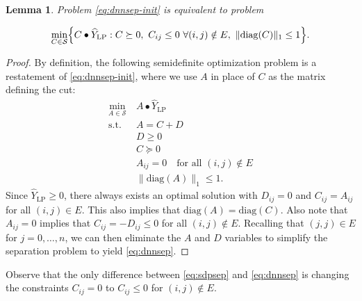 \documentclass[twoside]{article}
\newtheorem{lemma}[thm]{Lemma}
\newcommand{\oo}[1]{{\textcolor{blue}{#1}}}
\newcommand{\ooc}[1]{{ \oo{[OG comment: #1}]}}
\newcommand{\jim}[1]{{ \oo{[Jim comment: #1}]}}
\newcommand{\matip}[2]{#1 \bullet #2}
\begin{document}
	\begin{lemma}
		\label{lem:dnnform}
		Problem \eqref{eq:dnnsep-init} is equivalent to problem 
		
		\begin{equation}
			\label{eq:dnnsep}
			\min_{{C\in \mathcal S}} \Bigl\{ \matip{C}{\widehat{Y}_{\mathrm{LP}}} : C \succeq 0, \ C_{ij} \leq 0 \ \forall(i,j) \notin E, \ \| \mathrm{diag}(C)\|_1 \leq 1 \Bigr\} .
		\end{equation}
	\end{lemma}
	\begin{proof}
		By definition, the following semidefinite optimization problem is a restatement of %
		\eqref{eq:dnnsep-init}, where we use $A$ in place of $C$ as the matrix defining the cut:
		\begin{align*}
			\min_{{A\in \mathcal S}} \ & \matip{A}{\widehat{Y}_{\mathrm{LP}}}  \\
			\text{s.t. } & A = C +D \\
			& D \geq 0 \\
			& C \succeq 0\\
			& A_{ij} = 0 \quad \text{for all } (i,j) \notin E\\
			& \| \mathrm{diag}(A) \|_1 \leq 1 .
		\end{align*}
		Since $\widehat{Y}_{\mathrm{LP}} \geq 0$,  there always exists an optimal solution with $D_{ij} = 0$ and $C_{ij} = A_{ij}$  for all $(i,j) \in E$.
		This also implies that $\mathrm{diag}(A)=\mathrm{diag}(C)$. Also note that $A_{ij} = 0$ implies that $C_{ij} = -D_{ij}\le 0$ for all $(i,j) \notin E$. 
		Recalling that $(j,j) \in E$ for $j=0,\ldots,n$, we can then eliminate the $A$ and $D$ variables to  simplify the separation problem to yield \eqref{eq:dnnsep}.
	\end{proof}
	Observe that the only difference between \eqref{eq:sdpsep} and \eqref{eq:dnnsep} is changing the constraints $C_{ij}=0$ to $C_{ij} \leq 0$ for $(i,j) \notin E$.
	
\end{document}
